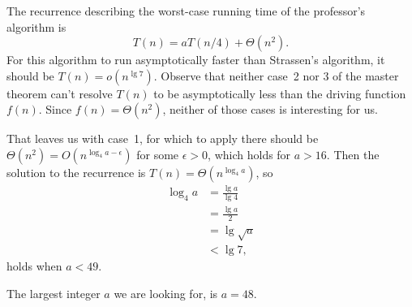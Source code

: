 The recurrence describing the worst-case running time of the professor's algorithm is
\[
    T(n) = aT(n/4)+\Theta(n^2).
\]
For this algorithm to run asymptotically faster than Strassen's algorithm, it should be $T(n)=o(n^{\lg7})$.
Observe that neither case~2 nor 3 of the master theorem can't resolve $T(n)$ to be asymptotically less than the driving function $f(n)$.
Since $f(n)=\Theta(n^2)$, neither of those cases is interesting for us.

That leaves us with case~1, for which to apply there should be $\Theta(n^2)=O(n^{\log_4a-\epsilon})$ for some $\epsilon>0$, which holds for $a>16$.
Then the solution to the recurrence is $T(n)=\Theta(n^{\log_4a})$, so
\begin{align*}
    \log_4a &= \frac{\lg a}{\lg4} \\[1mm]
    &= \frac{\lg a}{2} \\
    &= \lg\sqrt{a} \\
    &< \lg7,
\end{align*}
holds when $a<49$.

The largest integer $a$ we are looking for, is $a=48$.
